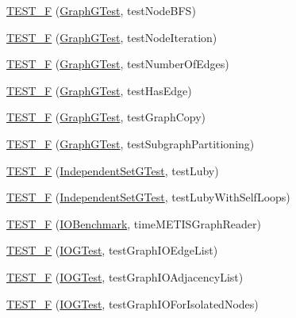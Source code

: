 \begin{DoxyCompactItemize}
\hyperlink{namespace_networ_kit_a612aaf58f0fb25ba9a3857d6d7a368c5}{T\-E\-S\-T\-\_\-\-F} (\hyperlink{class_networ_kit_1_1_graph_g_test}{Graph\-G\-Test}, test\-Node\-B\-F\-S)
\item 
\hyperlink{namespace_networ_kit_a4fe0b90775e29a85e72fa489e07c9613}{T\-E\-S\-T\-\_\-\-F} (\hyperlink{class_networ_kit_1_1_graph_g_test}{Graph\-G\-Test}, test\-Node\-Iteration)
\item 
\hyperlink{namespace_networ_kit_a4b9bf497a86a3e718747ba7c032d0e04}{T\-E\-S\-T\-\_\-\-F} (\hyperlink{class_networ_kit_1_1_graph_g_test}{Graph\-G\-Test}, test\-Number\-Of\-Edges)
\item 
\hyperlink{namespace_networ_kit_a29e5f774818257727d964f7f87c615f4}{T\-E\-S\-T\-\_\-\-F} (\hyperlink{class_networ_kit_1_1_graph_g_test}{Graph\-G\-Test}, test\-Has\-Edge)
\item 
\hyperlink{namespace_networ_kit_a74c614150184a67e72ddae02ba6611f5}{T\-E\-S\-T\-\_\-\-F} (\hyperlink{class_networ_kit_1_1_graph_g_test}{Graph\-G\-Test}, test\-Graph\-Copy)
\item 
\hyperlink{namespace_networ_kit_aba319b9314a527563d7d5d68ca83ca34}{T\-E\-S\-T\-\_\-\-F} (\hyperlink{class_networ_kit_1_1_graph_g_test}{Graph\-G\-Test}, test\-Subgraph\-Partitioning)
\item 
\hyperlink{namespace_networ_kit_a4fc0bfd7f1d51fb53b57d971efdd5b7a}{T\-E\-S\-T\-\_\-\-F} (\hyperlink{class_networ_kit_1_1_independent_set_g_test}{Independent\-Set\-G\-Test}, test\-Luby)
\item 
\hyperlink{namespace_networ_kit_adbe4aeb718867f6f04e5f9b7c8f7cc38}{T\-E\-S\-T\-\_\-\-F} (\hyperlink{class_networ_kit_1_1_independent_set_g_test}{Independent\-Set\-G\-Test}, test\-Luby\-With\-Self\-Loops)
\item 
\hyperlink{namespace_networ_kit_aee97d3f13ee3f1c38d22f87787977f02}{T\-E\-S\-T\-\_\-\-F} (\hyperlink{class_networ_kit_1_1_i_o_benchmark}{I\-O\-Benchmark}, time\-M\-E\-T\-I\-S\-Graph\-Reader)
\item 
\hyperlink{namespace_networ_kit_abfeadc0c717ce17ba66c181ac476658a}{T\-E\-S\-T\-\_\-\-F} (\hyperlink{class_networ_kit_1_1_i_o_g_test}{I\-O\-G\-Test}, test\-Graph\-I\-O\-Edge\-List)
\item 
\hyperlink{namespace_networ_kit_a1d569a24796a4dd591984cfd292500bf}{T\-E\-S\-T\-\_\-\-F} (\hyperlink{class_networ_kit_1_1_i_o_g_test}{I\-O\-G\-Test}, test\-Graph\-I\-O\-Adjacency\-List)
\item 
\hyperlink{namespace_networ_kit_a325ca6779f47341e7fb836e6c9b17d12}{T\-E\-S\-T\-\_\-\-F} (\hyperlink{class_networ_kit_1_1_i_o_g_test}{I\-O\-G\-Test}, test\-Graph\-I\-O\-For\-Isolated\-Nodes)

\end{DoxyCompactItemize}
